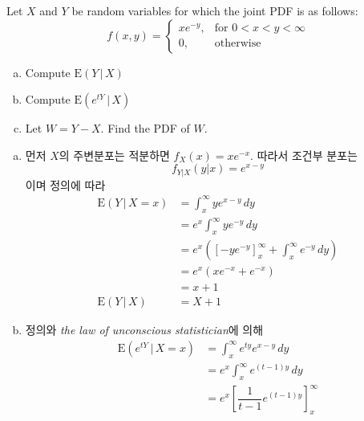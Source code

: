 \documentclass[answers]{exam}
\begin{document}
\newpage
{}
\begin{questions}
   \question
   Let $X$ and $Y$ be random variables for which the joint PDF is as follows:
   $$
    f\left(x,y\right) = \begin{cases}xe^{-y},& \text{for $0<x<y<\infty$}\\0,& \text{otherwise}  \end{cases}
   $$
   \begin{enumerate}[(a)]
    \item Compute $\mathrm{E}\left(Y\,|\,X\right)$
    \item Compute $\mathrm{E}\left(e^{tY}\,|\,X\right)$
    \item Let $W=Y-X$. Find the PDF of $W$.
   \end{enumerate}
   \begin{solution}
    \begin{enumerate}[(a)]
      \item 먼저 $X$의 주변분포는 적분하면 $f_{X}\left(x\right)=xe^{-x}$. 따라서 조건부 분포는
      \begin{equation}
        f_{Y|X}\left(y|x\right) = e^{x-y}
      \end{equation}
      이며 정의에 따라
      \begin{align}
        \mathrm{E}\left(Y\,|\,X=x\right) &= \int_{x}^{\infty}ye^{x-y}\,dy\\
        &=e^{x}\int_{x}^{\infty}ye^{-y}\,dy\\
        &=e^{x}\left(\left[-ye^{-y}\right]_{x}^{\infty}+\int_{x}^{\infty}e^{-y}\,dy\right)\\
        &=e^{x}\left(xe^{-x}+e^{-x}\right)\\
        &= x+1\\
        \mathrm{E}\left(Y\,|\,X\right) &= X+1
      \end{align}
      \item 정의와 \emph{the law of unconscious statistician}에 의해
      \begin{align}
        \mathrm{E}\left(e^{tY}\,|\,X=x\right) &= \int_{x}^{\infty}e^{ty}e^{x-y}\,dy\\
        &=e^{x}\int_{x}^{\infty}e^{\left(t-1\right)y}\,dy\\
        &=e^{x}\left[\dfrac{1}{t-1}e^{\left(t-1\right)y} \right]_{x}^{\infty}\\

\end{align}
\end{enumerate}
\end{solution}
\end{questions}
\end{document}
